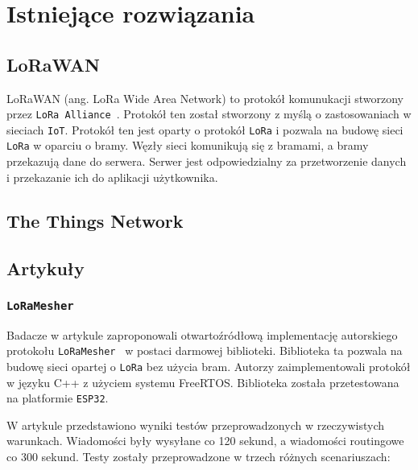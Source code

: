 \chapter{Istniejące rozwiązania}

\section{LoRaWAN}
LoRaWAN (ang. LoRa Wide Area Network) to protokół komunukacji stworzony przez \texttt{LoRa Alliance}~\cite{bib:lorawan}. Protokół ten został stworzony z myślą o zastosowaniach w sieciach \texttt{IoT}. Protokół ten jest oparty o protokół \texttt{LoRa} i pozwala na budowę sieci \texttt{LoRa} w oparciu o bramy. Węzły sieci komunikują się z bramami, a bramy przekazują dane do serwera. Serwer jest odpowiedzialny za przetworzenie danych i przekazanie ich do aplikacji użytkownika.

\section{The Things Network}



\section{Artykuły}
\subsection{\texttt{LoRaMesher}}
Badacze w artykule zaproponowali otwartoźródłową implementację autorskiego protokołu \texttt{LoRaMesher}~\cite{bib:loramesher} w postaci darmowej biblioteki. Biblioteka ta pozwala na budowę sieci opartej o \texttt{LoRa} bez użycia bram. Autorzy zaimplementowali protokół w języku C++ z użyciem systemu FreeRTOS. Biblioteka została przetestowana na platformie \texttt{ESP32}.

W artykule przedstawiono wyniki testów przeprowadzonych w rzeczywistych warunkach. Wiadomości były wysyłane co 120 sekund, a wiadomości routingowe co 300 sekund. Testy zostały przeprowadzone w trzech różnych scenariuszach:

